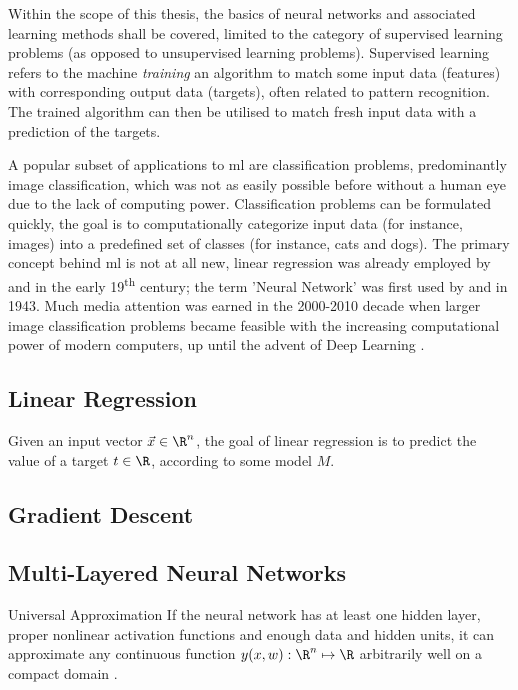 Within the scope of this thesis, the basics of neural networks and associated learning methods shall be covered,
limited to the category of supervised learning problems (as opposed to unsupervised learning problems).
Supervised learning refers to the machine \textit{training} an algorithm to match some input data (features)
with corresponding output data (targets), often related to pattern recognition.
The trained algorithm can then be utilised to match fresh input data with a prediction of the targets.

A popular subset of applications to \gls{ml} are classification problems, predominantly image classification,
which was not as easily possible before without a human eye due to the lack of computing power.
Classification problems can be formulated quickly, the goal is to computationally categorize input data
(for instance, images) into a predefined set of classes (for instance, cats and dogs).
The primary concept behind \acrlong{ml} is not at all new, linear regression
was already employed by  and  in the early 19\textsuperscript{th} century;
the term 'Neural Network' was first used by  and  in 1943.
Much media attention was earned in the 2000-2010 decade when larger image classification problems
became feasible with the increasing computational power of modern computers,
up until the advent of Deep Learning \parencite{bishop-pattern-recognition-and-ml}.

\subsection{Linear Regression}
Given an input vector $\vec{x} \in \R^n$, the goal of linear regression is to predict the value of a target $t \in \R$,
according to some model $M$.

\subsection{Gradient Descent}
\subsection{Multi-Layered Neural Networks}

\begin{theorem}{Universal Approximation}
  If the neural network has at least one hidden layer, proper nonlinear activation functions and enough
  data and hidden units, it can approximate any continuous function $y(x, w): \R^n \mapsto \R$
  arbitrarily well on a compact domain
  \parencite{1989-HornikMultilayerFN}.
\end{theorem}

